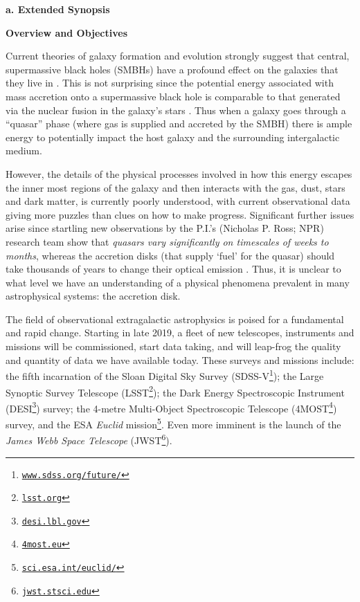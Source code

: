 \documentclass[oneside, a4paper, onecolumn, 11pt]{article}
\begin{document}
\smallskip
\smallskip
\noindent
{\bf{\textcolor{Cerulean}{a. Extended Synopsis}}} 
\vspace{6pt}

\noindent
\large
{\bf{\textcolor{Cerulean}{Overview and Objectives}}}
\normalsize

\smallskip
\noindent
Current theories of galaxy formation and evolution strongly suggest that central, supermassive black holes (SMBHs) have a profound effect on the galaxies that they live in 
\citep{Vogelsberger2014Nature, Schaye2015, SomervilleDave2015,Dave2017}. 
This is not surprising since the potential energy associated with mass accretion onto a supermassive black hole is comparable to that generated via the nuclear fusion in the galaxy's stars \citep[see e.g. ][]{Fabian2012}. Thus when a galaxy goes through a ``quasar'' phase (where gas is supplied and accreted by the SMBH) there is ample energy to potentially impact the host galaxy 
and the surrounding intergalactic medium. 

\smallskip
\smallskip
\noindent
However, the details of the physical processes involved in how this energy escapes the inner most regions of the galaxy and then interacts with the gas, dust, stars and dark matter, is currently poorly understood, with current observational data giving more puzzles than clues on how to make progress. Significant further issues arise since startling new observations by the P.I.’s (Nicholas P. Ross; NPR) research team \citep{MacLeod2016, Ross2018} show that {\it quasars vary significantly on timescales of weeks to months}, whereas the accretion disks (that supply `fuel' for the quasar) should take thousands of years to change their optical emission \citep[see e.g. ][]{Lawrence2018}. Thus, it is unclear to what level we have an understanding of a physical phenomena prevalent in many astrophysical systems: the accretion disk. 

\smallskip
\smallskip
\noindent
The field of observational extragalactic astrophysics is poised for a fundamental and rapid change. Starting in late 2019, a fleet of new telescopes, instruments and missions will be commissioned, start data taking, and will leap-frog the quality and quantity of data we have available today. These surveys and missions include: the fifth incarnation of the Sloan Digital Sky Survey (SDSS-V\footnote{\href{www.sdss.org/future/}{{\tt www.sdss.org/future/}}}); the Large Synoptic Survey Telescope (LSST\footnote{\href{lsst.org}{{\tt lsst.org}}}); the Dark Energy Spectroscopic Instrument (DESI\footnote{\href{desi.lbl.gov}{{\tt desi.lbl.gov}}}) survey; the 4-metre Multi-Object Spectroscopic Telescope (4MOST\footnote{\href{4most.eu}{{\tt 4most.eu}}}) survey, and the ESA {\it Euclid} mission\footnote{\href{sci.esa.int/euclid/}{{\tt sci.esa.int/euclid/}}}. Even more imminent is the launch of the {\it James Webb Space Telescope} (JWST\footnote{\href{jwst.stsci.edu}{{\tt jwst.stsci.edu}}}).
\end{document}
